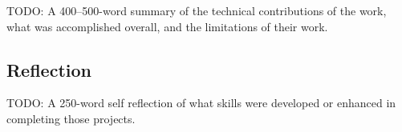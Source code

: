 














TODO: A 400–500-word summary of the technical contributions of the work, what was
accomplished overall, and the limitations of their work.

\subsection{Reflection}

TODO: A 250-word self reflection of what skills were developed or enhanced in completing those
projects.